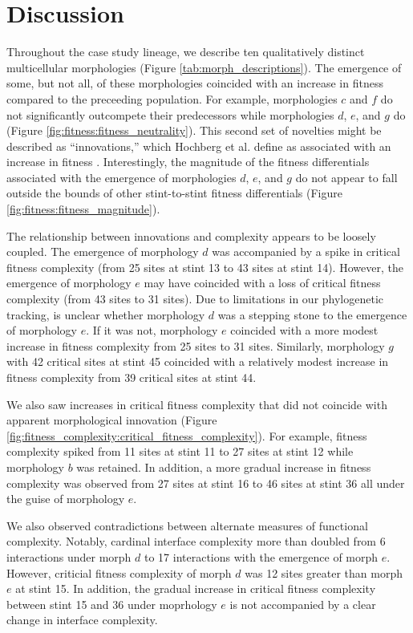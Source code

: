 \section{Discussion}

Throughout the case study lineage, we describe ten qualitatively distinct multicellular morphologies (Figure \ref{tab:morph_descriptions}).
The emergence of some, but not all, of these morphologies coincided with an increase in fitness compared to the preceeding population.
For example, morphologies $c$ and $f$ do not significantly outcompete their predecessors while morphologies $d$, $e$, and $g$ do (Figure \ref{fig:fitness:fitness_neutrality}).
This second set of novelties might be described as ``innovations,'' which Hochberg et al. define as associated with an increase in fitness \citep{hochberg2017innovation}.
Interestingly, the magnitude of the fitness differentials associated with the emergence of morphologies $d$, $e$, and $g$ do not appear to fall outside the bounds of other stint-to-stint fitness differentials (Figure \ref{fig:fitness:fitness_magnitude}).

The relationship between innovations and complexity appears to be loosely coupled.
The emergence of morphology $d$ was accompanied by a spike in critical fitness complexity (from 25 sites at stint 13 to 43 sites at stint 14).
However, the emergence of morphology $e$ may have coincided with a loss of critical fitness complexity (from 43 sites to 31 sites).
Due to limitations in our phylogenetic tracking, is unclear whether morphology $d$ was a stepping stone to the emergence of morphology $e$.
If it was not, morphology $e$ coincided with a more modest increase in fitness complexity from 25 sites to 31 sites.
Similarly, morphology $g$ with 42 critical sites at stint 45 coincided with a relatively modest increase in fitness complexity from 39 critical sites at stint 44.

We also saw increases in critical fitness complexity that did not coincide with apparent morphological innovation (Figure \ref{fig:fitness_complexity:critical_fitness_complexity}).
For example, fitness complexity spiked from 11 sites at stint 11 to 27 sites at stint 12 while morphology $b$ was retained.
In addition, a more gradual increase in fitness complexity was observed from 27 sites at stint 16 to 46 sites at stint 36 all under the guise of morphology $e$.

We also observed contradictions between alternate measures of functional complexity.
Notably, cardinal interface complexity more than doubled from 6 interactions under morph $d$ to 17 interactions with the emergence of morph $e$.
However, criticial fitness complexity of morph $d$ was 12 sites greater than morph $e$ at stint 15.
In addition, the gradual increase in critical fitness complexity between stint 15 and 36 under moprhology $e$ is not accompanied by a clear change in interface complexity.
